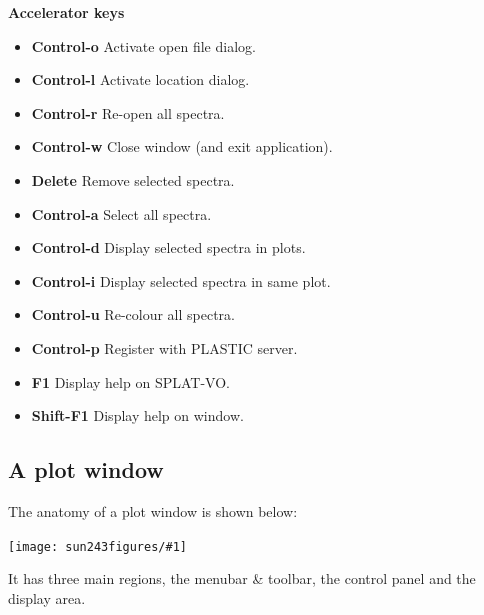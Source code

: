 \documentclass[twoside,11pt]{article}
\newcommand{\htmladdimg}[1]{}
\newcommand{\latexhtml}[2]{#1}
\newcommand{\xlabel}[1]{}
\renewcommand{\_}{\texttt{\symbol{95}}}
\newcommand{\SPLAT}{\textsf{SPLAT-VO}}
\newcommand{\mainfigure}[1]
{\begin{center}
 \latexhtml{\texttt{[image: sun243\_figures/\#1]}}{\htmladdimg{#1.gif}}
 \end{center}
}
\newcommand{\labelitem}[1]{\textbf{#1}}
\newcommand{\subheading}[1]{\textbf{\large{#1}}}
\begin{document}
\begin{quote}
\end{quote}

\subheading{Accelerator keys}

\begin{itemize}
\item \labelitem{Control-o} Activate open file dialog.
\item \labelitem{Control-l} Activate location dialog.
\item \labelitem{Control-r} Re-open all spectra.
\item \labelitem{Control-w} Close window (and exit application).
\item \labelitem{Delete} Remove selected spectra.
\item \labelitem{Control-a} Select all spectra.
\item \labelitem{Control-d} Display selected spectra in plots.
\item \labelitem{Control-i} Display selected spectra in same plot.
\item \labelitem{Control-u} Re-colour all spectra.
\item \labelitem{Control-p} Register with PLASTIC server.
\item \labelitem{F1} Display help on \SPLAT.
\item \labelitem{Shift-F1} Display help on window.
\end{itemize}

\newpage
\subsection{A plot window\xlabel{plot_window}}

The anatomy of a plot window is shown below:

\mainfigure{plot3}

It has three main regions, the menubar \& toolbar, the control panel and
the display area.\\
\end{document}
